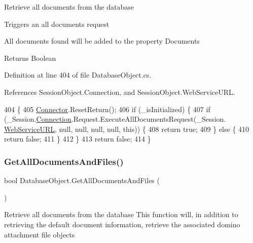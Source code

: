 Retrieve all documents from the database 

Triggers an all documents request

All documents found will be added to the property \textquotesingle{}Documents\textquotesingle{}

\begin{DoxyReturn}{Returns}
Boolean
\end{DoxyReturn}


Definition at line 404 of file Database\+Object.\+cs.



References Session\+Object.\+Connection, and Session\+Object.\+Web\+Service\+U\+RL.


\begin{DoxyCode}
404                                   \{
405         \mbox{\hyperlink{class_connector}{Connector}}.ResetReturn();
406         \textcolor{keywordflow}{if} (\_isInitialized) \{
407             \textcolor{keywordflow}{if} (\_Session.\mbox{\hyperlink{class_session_object_a014bdbf705a753540e19bfb53030c55c}{Connection}}.Request.ExecuteAllDocumentsRequest(\_Session.
      \mbox{\hyperlink{class_session_object_a697c071c812fbf7ad1166b896fb44c16}{WebServiceURL}}, null, null, null, null, \textcolor{keyword}{this})) \{
408                 \textcolor{keywordflow}{return} \textcolor{keyword}{true};
409             \} \textcolor{keywordflow}{else} \{
410                 \textcolor{keywordflow}{return} \textcolor{keyword}{false};
411             \}
412         \}
413         \textcolor{keywordflow}{return} \textcolor{keyword}{false};
414     \}
\end{DoxyCode}
\mbox{\label{class_database_object_a72239fa2b2a549665e45cdd340cd70a0}} 
\subsubsection{\texorpdfstring{Get\+All\+Documents\+And\+Files()}{GetAllDocumentsAndFiles()}}
{\footnotesize\ttfamily bool Database\+Object.\+Get\+All\+Documents\+And\+Files (\begin{DoxyParamCaption}{ }\end{DoxyParamCaption})}



Retrieve all documents from the database This function will, in addition to retrieving the default document information, retrieve the associated domino attachment file objects 

